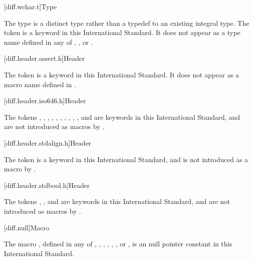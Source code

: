 [diff.wchar.t]{Type }

\pnum
The type  is a distinct type rather than a typedef to an
existing integral type.
The token 
is a keyword in this International Standard.
It does not appear as a type name defined in any of
,
,
or .

[diff.header.assert.h]{Header }
%

\pnum
The token  is a keyword in this International
Standard. It does not appear as a macro name defined
in .

[diff.header.iso646.h]{Header }
%

\pnum
The tokens
,
,
,
,
,
,
,
,
,
,
and
are keywords in this International
Standard,
and are not introduced as macros
by .

[diff.header.stdalign.h]{Header }
%

\pnum
The token  is a keyword in this International
Standard,
and is not introduced as a macro
by .

[diff.header.stdbool.h]{Header }
%

\pnum
The tokens , , and 
are keywords in this International Standard,
and are not introduced as macros
by .

[diff.null]{Macro }

\pnum
The macro
,
defined in any of
,
,
,
,
,
,
or ,
is an  \Cpp{} null pointer constant in
this International Standard.

